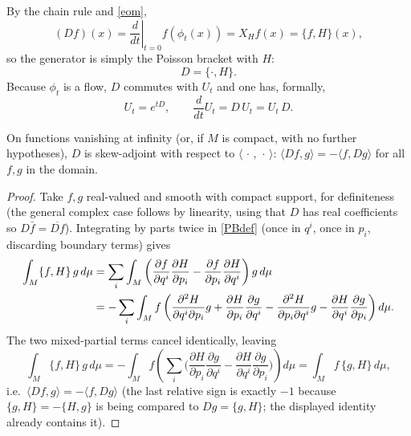 By the chain rule and \eqref{eom},
\begin{equation}
(Df)(x) = \left.\frac{d}{d t}\right|_{t=0} 
    f(\phi_t(x)) = X_H f(x) = \{f,H\}(x),
\end{equation}
so the generator is simply the Poisson bracket with $H$:
\begin{equation}
D = \{\cdot,H\}.
\label{Ddef}
\end{equation}
Because $\phi_t$ is a flow, $D$ commutes with $U_t$ and one has, 
formally,
\begin{equation}
U_t = e^{tD}, \qquad \frac{d}{d t}U_t = D\,U_t = U_t\,D.
\label{Uexp}
\end{equation}

\begin{proposition}
\label{skew}
On functions vanishing at infinity (or, if $M$ is compact, with no further 
    hypotheses), $D$ is skew-adjoint with respect to 
    $\langle\,\cdot\,,\,\cdot\,\rangle$: $\langle Df,g\rangle =
    -\langle f,Dg\rangle$ for all $f,g$ in the domain.
\end{proposition}
\begin{proof}
Take $f,g$ real-valued and smooth with compact support, for definiteness 
    (the general complex case follows by linearity, using that $D$ has real
    coefficients so $D\bar f=\overline{Df}$). Integrating by parts twice in 
    \eqref{PBdef} (once in $q^i$, once in $p_i$, discarding boundary terms) 
    gives
\begin{align}
\int_M \{f,H\}\,g\,d\mu
&= \sum_i\int_M\left(\frac{\partial f}{\partial q^i}\frac{\partial H}
    {\partial p_i}-\frac{\partial f}{\partial p_i}\frac{\partial H}
    {\partial q^i}\right)g\,d\mu \notag\\
&= -\sum_i\int_M f\left(\frac{\partial^2H}{\partial q^i\partial p_i}g
    +\frac{\partial H}{\partial p_i}\frac{\partial g}{\partial q^i}
    -\frac{\partial^2H}{\partial p_i\partial q^i}g
    -\frac{\partial H}{\partial q^i}\frac{\partial g}
    {\partial p_i}\right)d\mu.
\end{align}
The two mixed-partial terms cancel identically, leaving
\begin{equation}
\int_M \{f,H\}\,g\,d\mu = -\int_M f\left(\sum_i\Big(\frac{\partial H}
    {\partial p_i}\frac{\partial g}{\partial q^i}-
    \frac{\partial H}{\partial q^i}\frac{\partial g}
    {\partial p_i}\Big)\right)d\mu = \int_M f\,\{g,H\}\,d\mu,
\end{equation}
i.e.\ $\langle Df,g\rangle = -\langle f, Dg\rangle$ (the last relative sign is
    exactly $-1$ because $\{g,H\}=-\{H,g\}$ is being compared to 
    $D g = \{g,H\}$; the displayed identity already contains it).
\end{proof}

